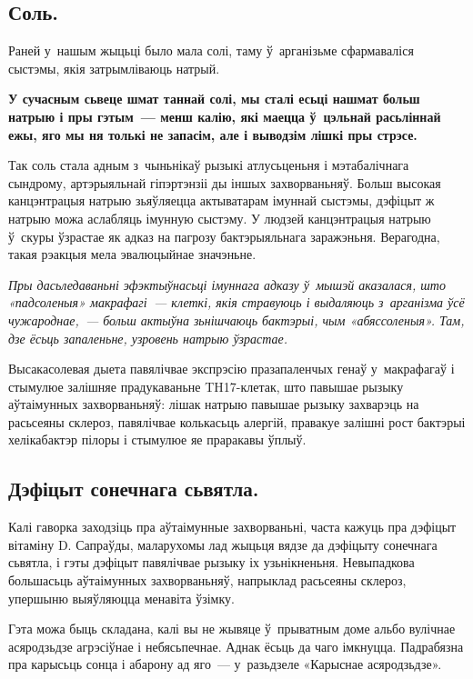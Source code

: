 \subsection*{Соль.}

Раней у~нашым жыцьці было мала солі, таму ў~арганізьме сфармаваліся сыстэмы, якія затрымліваюць натрый. 

\textbf{У сучасным сьвеце шмат таннай солі, мы сталі есьці нашмат больш натрыю і пры гэтым~--- менш калію, які маецца ў~цэльнай расьліннай ежы, яго мы ня толькі не запасім, але і выводзім лішкі пры стрэсе.}

Так соль стала адным з~чыньнікаў рызыкі атлусьценьня і мэтабалічнага сындрому, артэрыяльнай гіпэртэнзіі ды іншых захворваньняў. Больш высокая канцэнтрацыя натрыю зьяўляецца актыватарам імуннай сыстэмы, дэфіцыт ж натрыю можа аслабляць імунную сыстэму. У людзей канцэнтрацыя натрыю ў~скуры ўзрастае як адказ на пагрозу бактэрыяльнага заражэньня. Верагодна, такая рэакцыя мела эвалюцыйнае значэньне.

\emph{Пры дасьледаваньні эфэктыўнасьці імуннага адказу ў~мышэй аказалася, што «падсоленыя» макрафагі~--- клеткі, якія стравуюць і выдаляюць з~арганізма ўсё чужароднае,~--- больш актыўна зьнішчаюць бактэрыі, чым «абяссоленыя». Там, дзе ёсьць запаленьне, узровень натрыю ўзрастае.}

Высакасолевая дыета павялічвае экспрэсію празапаленчых генаў у~макрафагаў і стымулюе залішняе прадукаваньне TH17-клетак, што павышае рызыку аўтаімунных захворваньняў: лішак натрыю павышае рызыку захварэць на расьсеяны склероз, павялічвае колькасьць алергій, правакуе залішні рост бактэрыі хелікабактэр пілоры і стымулюе яе праракавы ўплыў.

\subsection*{Дэфіцыт сонечнага сьвятла.}

Калі гаворка заходзіць пра аўтаімунные захворваньні, часта кажуць пра дэфіцыт вітаміну D. Сапраўды, маларухомы лад жыцьця вядзе да дэфіцыту сонечнага сьвятла, і гэты дэфіцыт павялічвае рызыку іх узьнікненьня. Невыпадкова большасьць аўтаімунных захворваньняў, напрыклад расьсеяны склероз, упершыню выяўляюцца менавіта ўзімку. 


Гэта можа быць складана, калі вы не жывяце ў~прыватным доме альбо вулічнае асяродзьдзе агрэсіўнае і небясьпечнае. Аднак ёсьць да чаго імкнуцца. Падрабязна пра карысьць сонца і абарону ад яго~--- у~разьдзеле «Карыснае асяродзьдзе».

